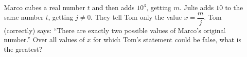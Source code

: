 Marco cubes a real number $t$ and then adds $10^3$, getting $m$. Julie adds $10$ to the same number $t$, getting $j\ne0$. They tell Tom only the value $x=\dfrac {m}{j}$. Tom (correctly) says: ``There are exactly two possible values of Marco's original number.'' Over all values of $x$ for which Tom's statement could be false, what is the greatest?
